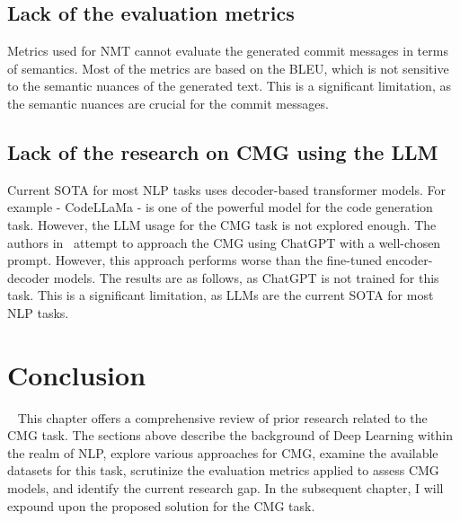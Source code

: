\subsection{Lack of the evaluation metrics}
Metrics used for NMT cannot evaluate the generated commit messages in terms of semantics. Most of the metrics are based on the BLEU, which is not sensitive to the semantic nuances of the generated text. This is a significant limitation, as the semantic nuances are crucial for the commit messages.

\subsection{Lack of the research on CMG using the LLM}\label{subsec:lack_og_metrics}
Current SOTA for most NLP tasks uses decoder-based transformer models. For example {-} CodeLLaMa{ }\cite{roziere2023code} {-} is one of the powerful model for the code generation task. However, the LLM usage for the CMG task is not explored enough. The authors in~\cite{eliseeva2023commit} attempt to approach the CMG using ChatGPT with a well-chosen prompt. However, this approach performs worse than the fine-tuned encoder-decoder models. The results are as follows, as ChatGPT is not trained for this task. This is a significant limitation, as LLMs are the current SOTA for most NLP tasks.

\section{Conclusion}~\label{sec:lr_conclusion}
This chapter offers a comprehensive review of prior research related to the CMG task. The sections above describe the background of Deep Learning within the realm of NLP, explore various approaches for CMG, examine the available datasets for this task, scrutinize the evaluation metrics applied to assess CMG models, and identify the current research gap. In the subsequent chapter, I will expound upon the proposed solution for the CMG task.
